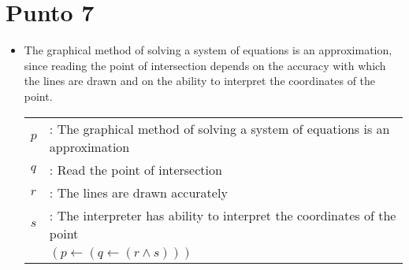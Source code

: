 \documentclass{article}
\begin{document}
\section{Punto 7}
\begin{itemize}
	\item The graphical method of solving a system of equations is an approximation, since reading the point of intersection depends on the accuracy with which the lines are drawn and on the ability to interpret the coordinates of the point.
	      \begin{center}
		      \begin{NiceTabular}{l l}
			      $p$ & : The graphical method of solving a system of equations is an approximation \\
			      $q$ & : Read the point of intersection                                            \\
			      $r$ & : The lines are drawn accurately                                            \\
			      $s$ & : The interpreter has ability to interpret the coordinates of the point     \\
			      \hline
			          & $(p \gets (q \gets (r \wedge s)))$
		      \end{NiceTabular}
	      \end{center}
\end{itemize}
\end{document}
